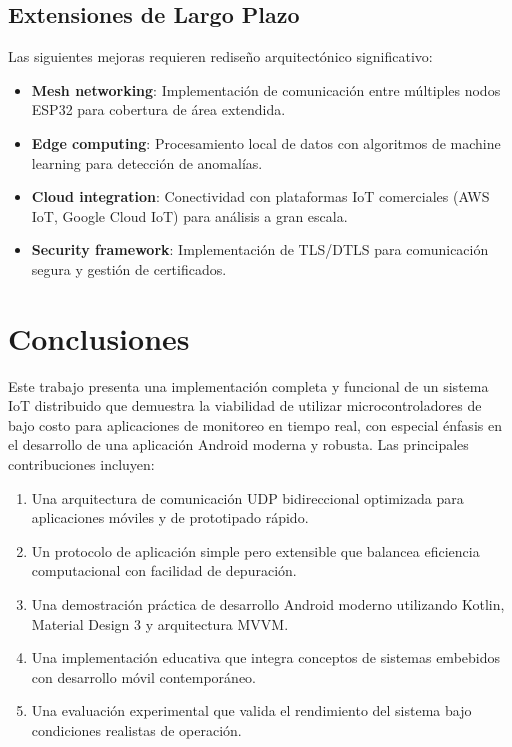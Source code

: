 \documentclass[conference,a4paper]{IEEEtran}
\begin{document}
\subsection{Extensiones de Largo Plazo}

Las siguientes mejoras requieren rediseño arquitectónico significativo:

\begin{itemize}
    \item \textbf{Mesh networking}: Implementación de comunicación entre múltiples nodos ESP32 para cobertura de área extendida.
    \item \textbf{Edge computing}: Procesamiento local de datos con algoritmos de machine learning para detección de anomalías.
    \item \textbf{Cloud integration}: Conectividad con plataformas IoT comerciales (AWS IoT, Google Cloud IoT) para análisis a gran escala.
    \item \textbf{Security framework}: Implementación de TLS/DTLS para comunicación segura y gestión de certificados.
\end{itemize}

\section{Conclusiones}

Este trabajo presenta una implementación completa y funcional de un sistema IoT distribuido que demuestra la viabilidad de utilizar microcontroladores de bajo costo para aplicaciones de monitoreo en tiempo real, con especial \'enfasis en el desarrollo de una aplicaci\'on Android moderna y robusta. Las principales contribuciones incluyen:

\begin{enumerate}
    \item Una arquitectura de comunicación UDP bidireccional optimizada para aplicaciones móviles y de prototipado rápido.
    \item Un protocolo de aplicación simple pero extensible que balancea eficiencia computacional con facilidad de depuración.
    \item Una demostración práctica de desarrollo Android moderno utilizando Kotlin, Material Design 3 y arquitectura MVVM.
    \item Una implementación educativa que integra conceptos de sistemas embebidos con desarrollo móvil contemporáneo.
    \item Una evaluación experimental que valida el rendimiento del sistema bajo condiciones realistas de operación.
\end{enumerate}
\end{document}
